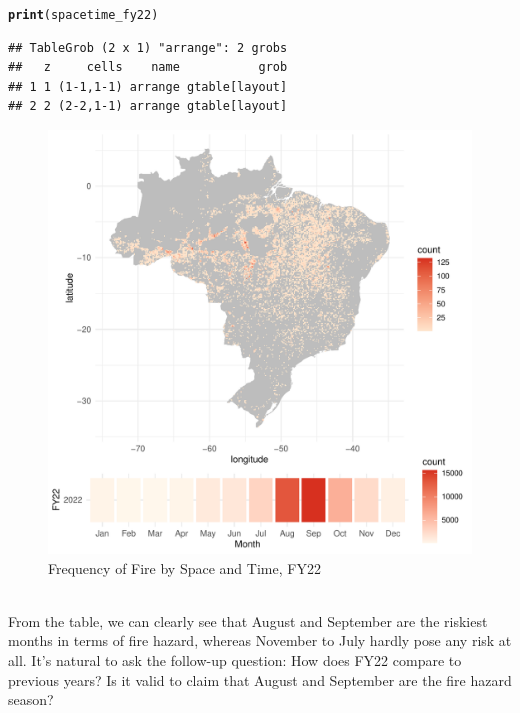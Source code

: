 \documentclass{article}\usepackage[]{graphicx}\usepackage[]{xcolor}
\makeatletter
\def\maxwidth{ %
  \ifdim\Gin@nat@width>\linewidth
    \linewidth
  \else
    \Gin@nat@width
  \fi
}
\newcommand{\hlstd}[1]{\textcolor[rgb]{0.345,0.345,0.345}{#1}}%
\newcommand{\hlkwd}[1]{\textcolor[rgb]{0.737,0.353,0.396}{\textbf{#1}}}%
\newenvironment{kframe}{%
 \def\at@end@of@kframe{}%
 \ifinner\ifhmode%
  \def\at@end@of@kframe{\end{minipage}}%
  \begin{minipage}{\columnwidth}%
 \fi\fi%
 \def\FrameCommand##1{\hskip\@totalleftmargin \hskip-\fboxsep
 \colorbox{shadecolor}{##1}\hskip-\fboxsep
     \hskip-\linewidth \hskip-\@totalleftmargin \hskip\columnwidth}%
 \MakeFramed {\advance\hsize-\width
   \@totalleftmargin\z@ \linewidth\hsize
   \@setminipage}}%
 {\par\unskip\endMakeFramed%
 \at@end@of@kframe}
\newenvironment{knitrout}{}{} %
\makeatother
\begin{document}
\begin{knitrout}
\begin{kframe}
\begin{alltt}
\hlkwd{print}\hlstd{(spacetime_fy22)}
\end{alltt}
\begin{verbatim}
## TableGrob (2 x 1) "arrange": 2 grobs
##   z     cells    name           grob
## 1 1 (1-1,1-1) arrange gtable[layout]
## 2 2 (2-2,1-1) arrange gtable[layout]
\end{verbatim}
\end{kframe}\begin{figure}
\includegraphics[width=\maxwidth]{figure/spacetime-fy22-1} \caption[Frequency of Fire by Space and Time, FY22]{Frequency of Fire by Space and Time, FY22}\label{fig:spacetime-fy22}
\end{figure}

\end{knitrout}
\\From the table, we can clearly see that August and September are the riskiest months in terms of fire hazard, whereas November to July hardly pose any risk at all. It's natural to ask the follow-up question: How does FY22 compare to previous years? Is it valid to claim that August and September are the fire hazard season?
\end{document}

